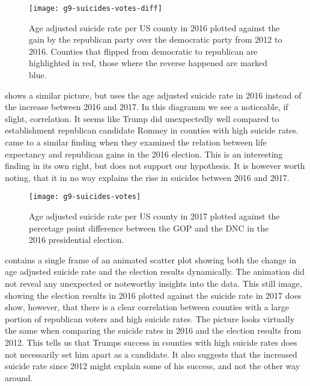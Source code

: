 \begin{figure}[tb]
\centering
\texttt{[image: g9-suicides-votes-diff]}
\caption{Age adjusted suicide rate per US county in 2016 plotted against the gain by the republican party over the democratic party from 2012 to 2016. Counties that flipped from democratic to republican are highlighted in red, those where the reverse happened are marked blue.}
\label{fig:suicides-votes-diff}
\end{figure}

\par
{} shows a similar picture, but uses the age adjusted suicide rate in 2016 instead of the increase between 2016 and 2017.
In this diagramm we see a noticeable, if slight, correlation.
It seems like Trump did unexpectedly well compared to establishment republican candidate Romney in counties with high suicide rates.
\cite{goldman2018} came to a similar finding when they examined the relation between life expectancy and republican gains in the 2016 election.
This is an interesting finding in its own right, but does not support our hypothesis.
It is however worth noting, that it in no way explains the rise in suicides between 2016 and 2017.

\begin{figure}[tb]
\centering
\texttt{[image: g9-suicides-votes]}
\caption{Age adjusted suicide rate per US county in 2017 plotted against the percetage point difference between the GOP and the DNC in the 2016 presidential election.}
\label{fig:suicides-votes}
\end{figure}

\par
{} contains a single frame of an animated scatter plot showing both the change in age adjusted suicide rate and the election results dynamically.
The animation did not reveal any unexpected or noteworthy insights into the data.
This still image, showing the election results in 2016 plotted against the suicide rate in 2017 does show, however, that there is a clear correlation between counties with a large portion of republican voters and high suicide rates.
The picture looks virtually the same when comparing the suicide rates in 2016 and the election results from 2012.
This tells us that Trumps success in counties with high suicide rates does not necessarily set him apart as a candidate.
It also suggests that the increased suicide rate since 2012 might explain some of his success, and not the other way around.

